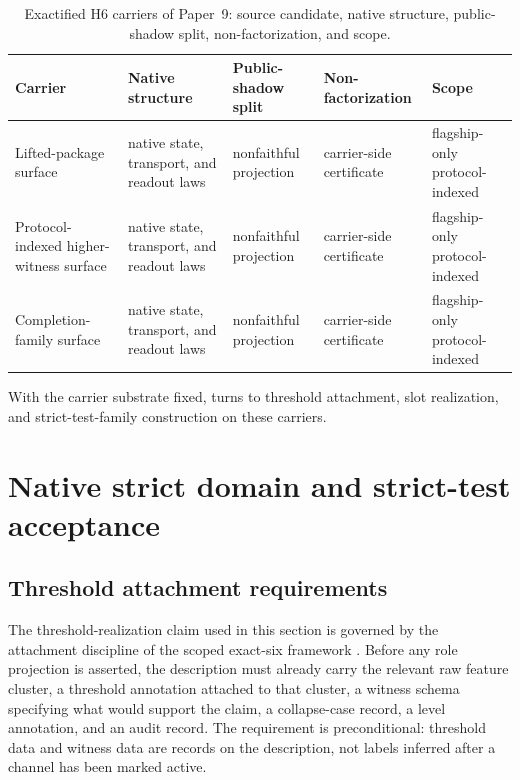 \documentclass[11pt]{article}
\newcommand{\NewLayer}{H6}
\newcommand{\PaperNine}{Paper~9}
\theoremstyle{definition}
\begin{document}
\begin{table}[tbp]
  \centering
  \caption{Exactified \NewLayer{} carriers of \PaperNine{}: source candidate, native structure, public-shadow split, non-factorization, and scope.}
  \label{tab:exactified-carriers}
  \small
  \begin{tabularx}{\textwidth}{@{}>{\raggedright\arraybackslash}p{}>{\raggedright\arraybackslash}X>{\raggedright\arraybackslash}p{}>{\raggedright\arraybackslash}p{}>{\raggedright\arraybackslash}p{}@{}}
    \toprule
    Carrier & Native structure & Public-shadow split & Non-factorization & Scope \\
    \midrule
    Lifted-package surface
      & native state, transport, and readout laws
      & nonfaithful projection
      & carrier-side certificate
      & flagship-only protocol-indexed \\
    Protocol-indexed higher-witness surface
      & native state, transport, and readout laws
      & nonfaithful projection
      & carrier-side certificate
      & flagship-only protocol-indexed \\
    Completion-family surface
      & native state, transport, and readout laws
      & nonfaithful projection
      & carrier-side certificate
      & flagship-only protocol-indexed \\
    \bottomrule
  \end{tabularx}
\end{table}
 
With the carrier substrate fixed,  turns to threshold
attachment, slot realization, and strict-test-family construction on these
carriers.
 \section{Native strict domain and strict-test acceptance}\label{sec:primary-results}

\subsection{Threshold attachment requirements}\label{subsec:threshold-attachment-requirements}

The threshold-realization claim used in this section is governed by the
attachment discipline of the scoped exact-six framework
\cite{Tsiokos2026FoundationsII}.  Before any role projection is asserted, the
description must already carry the relevant raw feature cluster, a threshold
annotation attached to that cluster, a witness schema specifying what would
support the claim, a collapse-case record, a level annotation, and an audit
record.  The requirement is preconditional: threshold data and witness data are
records on the description, not labels inferred after a channel has been marked
active.
\end{document}
